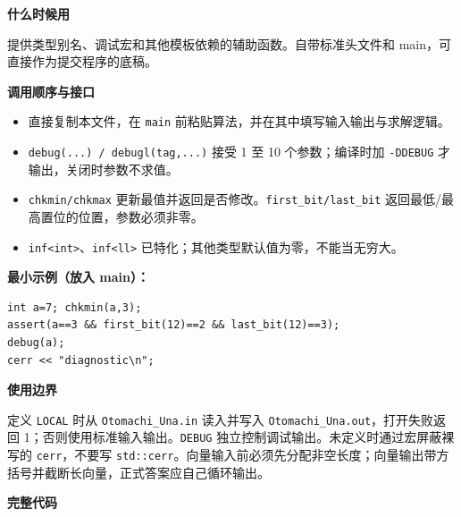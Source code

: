 \documentclass[UTF8,a4paper,10pt]{ctexart}
\newcommand{\TemplUsage}[1]{\textbf{什么时候用}\par #1\par}
\newcommand{\TemplApi}[1]{\textbf{调用顺序与接口}\par #1\par}
\newcommand{\TemplNote}[1]{\textbf{使用边界}\par #1\par}
\begin{document}
\TemplUsage{提供类型别名、调试宏和其他模板依赖的辅助函数。自带标准头文件和 main，可直接作为提交程序的底稿。}
\TemplApi{\begin{itemize}
\item 直接复制本文件，在 \texttt{main} 前粘贴算法，并在其中填写输入输出与求解逻辑。
\item \texttt{debug(...) / debugl(tag,...)} 接受 1 至 10 个参数；编译时加 \texttt{-DDEBUG} 才输出，关闭时参数不求值。
\item \texttt{chkmin/chkmax} 更新最值并返回是否修改。\texttt{first\_bit/last\_bit} 返回最低/最高置位的位置，参数必须非零。
\item \texttt{inf<int>}、\texttt{inf<ll>} 已特化；其他类型默认值为零，不能当无穷大。
\end{itemize}}
\textbf{最小示例（放入 main）：}
\begin{lstlisting}
int a=7; chkmin(a,3);
assert(a==3 && first_bit(12)==2 && last_bit(12)==3);
debug(a);
cerr << "diagnostic\n";
\end{lstlisting}
\TemplNote{定义 \texttt{LOCAL} 时从 \texttt{Otomachi\_Una.in} 读入并写入 \texttt{Otomachi\_Una.out}，打开失败返回 1；否则使用标准输入输出。\texttt{DEBUG} 独立控制调试输出。未定义时通过宏屏蔽裸写的 \texttt{cerr}，不要写 \texttt{std::cerr}。向量输入前必须先分配非空长度；向量输出带方括号并截断长向量，正式答案应自己循环输出。}
\textbf{完整代码}
\end{document}
